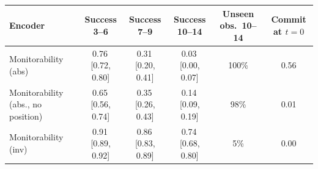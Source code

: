 \begin{tabular}{lccccc}
\toprule
Encoder & Success 3--6 & Success 7--9 & Success 10--14 & Unseen obs.\ 10--14 & Commit at $t{=}0$ \\
\midrule
Monitorability (abs) & 0.76\,{\scriptsize[0.72, 0.80]} & 0.31\,{\scriptsize[0.20, 0.41]} & 0.03\,{\scriptsize[0.00, 0.07]} & 100\% & 0.56 \\
Monitorability (abs., no position) & 0.65\,{\scriptsize[0.56, 0.74]} & 0.35\,{\scriptsize[0.26, 0.43]} & 0.14\,{\scriptsize[0.09, 0.19]} & 98\% & 0.01 \\
Monitorability (inv) & 0.91\,{\scriptsize[0.89, 0.92]} & 0.86\,{\scriptsize[0.83, 0.89]} & 0.74\,{\scriptsize[0.68, 0.80]} & 5\% & 0.00 \\
\bottomrule
\end{tabular}
